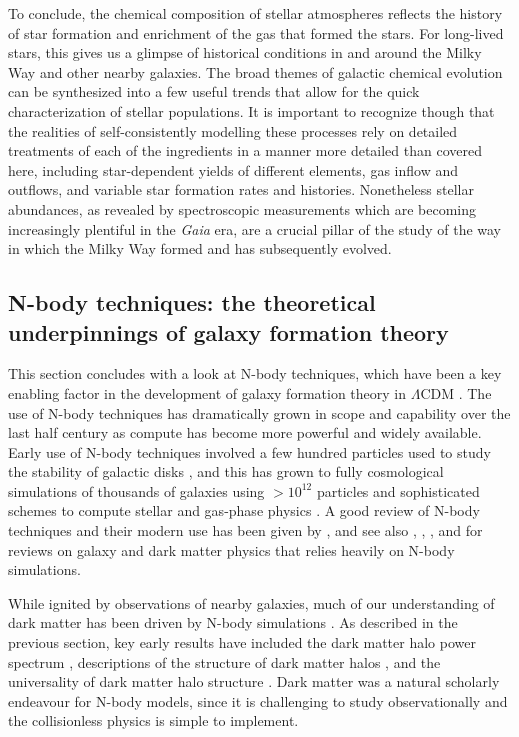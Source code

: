 To conclude, the chemical composition of stellar atmospheres reflects the history of star formation and enrichment of the gas that formed the stars. For long-lived stars, this gives us a glimpse of historical conditions in and around the Milky Way and other nearby galaxies. The broad themes of galactic chemical evolution can be synthesized into a few useful trends that allow for the quick characterization of stellar populations. It is important to recognize though that the realities of self-consistently modelling these processes rely on detailed treatments of each of the ingredients in a manner more detailed than covered here, including star-dependent yields of different elements, gas inflow and outflows, and variable star formation rates and histories. Nonetheless stellar abundances, as revealed by spectroscopic measurements which are becoming increasingly plentiful in the \textit{Gaia} era, are a crucial pillar of the study of the way in which the Milky Way formed and has subsequently evolved.

\subsection{N-body techniques: the theoretical underpinnings of galaxy formation theory}

This section concludes with a look at N-body techniques, which have been a key enabling factor in the development of galaxy formation theory in $\Lambda$CDM \parencite{frenk12}. The use of N-body techniques has dramatically grown in scope and capability over the last half century as compute has become more powerful and widely available. Early use of N-body techniques involved a few hundred particles used to study the stability of galactic disks \parencite[e.g.][]{ostriker73}, and this has grown to fully cosmological simulations of thousands of galaxies using $> 10^{12}$ particles and sophisticated schemes to compute stellar and gas-phase physics \parencite[e.g.][]{eagle_model_crain15,wetzel16,tng_model_pillepich18}. A good review of N-body techniques and their modern use has been given by \textcite{crain23}, and see also \textcite{frenk12}, \textcite{somerville15}, \textcite{bullock17}, and \textcite{wechsler18} for reviews on galaxy and dark matter physics that relies heavily on N-body simulations.

While ignited by observations of nearby galaxies, much of our understanding of dark matter has been driven by N-body simulations \parencite{frenk12}. As described in the previous section, key early results have included the dark matter halo power spectrum \parencite{press74}, descriptions of the structure of dark matter halos \parencite{efstathiou88,dubinski91}, and the universality of dark matter halo structure \parencite{navarro96,navarro97}. Dark matter was a natural scholarly endeavour for N-body models, since it is challenging to study observationally and the collisionless physics is simple to implement. 


